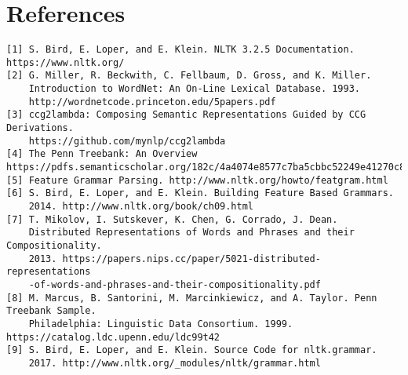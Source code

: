 \documentclass{article}[12pt]
\theoremstyle{definition}
\begin{document}
\section{References}

\begin{verbatim}
[1] S. Bird, E. Loper, and E. Klein. NLTK 3.2.5 Documentation. https://www.nltk.org/
[2] G. Miller, R. Beckwith, C. Fellbaum, D. Gross, and K. Miller. 
    Introduction to WordNet: An On-Line Lexical Database. 1993. 
    http://wordnetcode.princeton.edu/5papers.pdf 
[3] ccg2lambda: Composing Semantic Representations Guided by CCG Derivations. 
    https://github.com/mynlp/ccg2lambda
[4] The Penn Treebank: An Overview
https://pdfs.semanticscholar.org/182c/4a4074e8577c7ba5cbbc52249e41270c8d64.pdf
[5] Feature Grammar Parsing. http://www.nltk.org/howto/featgram.html
[6] S. Bird, E. Loper, and E. Klein. Building Feature Based Grammars. 
    2014. http://www.nltk.org/book/ch09.html
[7] T. Mikolov, I. Sutskever, K. Chen, G. Corrado, J. Dean. 
    Distributed Representations of Words and Phrases and their Compositionality. 
    2013. https://papers.nips.cc/paper/5021-distributed-representations
    -of-words-and-phrases-and-their-compositionality.pdf 
[8] M. Marcus, B. Santorini, M. Marcinkiewicz, and A. Taylor. Penn Treebank Sample. 
    Philadelphia: Linguistic Data Consortium. 1999. https://catalog.ldc.upenn.edu/ldc99t42
[9] S. Bird, E. Loper, and E. Klein. Source Code for nltk.grammar. 
    2017. http://www.nltk.org/_modules/nltk/grammar.html
\end{verbatim}
\end{document}
